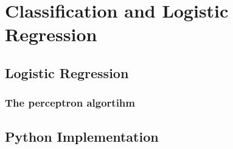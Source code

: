 \section{Classification and Logistic Regression}

\subsection{Logistic Regression}

\subsubsection{The perceptron algortihm}

\subsection{Python Implementation}